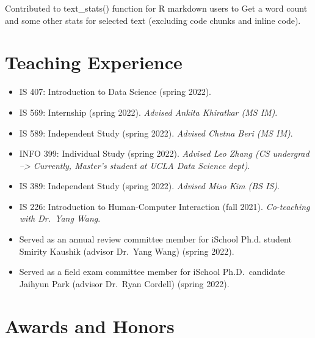 \documentclass[11pt,a4paper,]{awesome-cv}
\begin{document}
\begin{cventries}
{\begin{cvitems}
\item Contributed to text\_stats() function for R markdown users to Get a word count and some other stats for selected text (excluding code chunks and inline code).
\end{cvitems}}
\end{cventries}

\hypertarget{teaching-experience}{%
\section{Teaching Experience}\label{teaching-experience}}

\begin{itemize}
\item
  IS 407: Introduction to Data Science (spring 2022).
\item
  IS 569: Internship (spring 2022). \emph{Advised Ankita Khiratkar (MS
  IM)}.
\item
  IS 589: Independent Study (spring 2022). \emph{Advised Chetna Beri (MS
  IM)}.
\item
  INFO 399: Individual Study (spring 2022). \emph{Advised Leo Zhang (CS
  undergrad --\textgreater{} Currently, Master's student at UCLA Data
  Science dept)}.
\item
  IS 389: Independent Study (spring 2022). \emph{Advised Miso Kim (BS
  IS)}.
\item
  IS 226: Introduction to Human-Computer Interaction (fall 2021).
  \emph{Co-teaching with Dr.~Yang Wang}.
\item
  Served as an annual review committee member for iSchool Ph.d. student
  Smirity Kaushik (advisor Dr.~Yang Wang) (spring 2022).
\item
  Served as a field exam committee member for iSchool Ph.D.~candidate
  Jaihyun Park (advisor Dr.~Ryan Cordell) (spring 2022).
\end{itemize}

\hypertarget{awards-and-honors}{%
\section{Awards and Honors}\label{awards-and-honors}}
\end{document}
